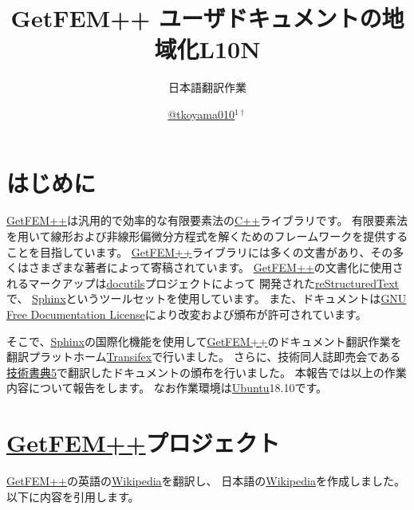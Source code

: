 \documentclass{../../style/ltjoc}
\title{GetFEM++ ユーザドキュメントの地域化L10N}
\subtitle{日本語翻訳作業}
\author{%
\href{https://twitter.com/tkoyama010}{@tkoyama010}$^{1\dagger}$%
}
\affiliation{%
${}^{1}$\href{https://tkoyama010.github.io/getfem-docs-html-ja/}{GetFEM++ Japanese Team}%
}
\begin{document}
\maketitle
\section{はじめに}
\href{http://getfem.org}{GetFEM++}は汎用的で効率的な有限要素法の\href{https://isocpp.org/}{C++}ライブラリです。
有限要素法を用いて線形および非線形偏微分方程式を解くためのフレームワークを提供することを目指しています。
\href{http://getfem.org}{GetFEM++}ライブラリには多くの文書があり、その多くはさまざまな著者によって寄稿されています。
\href{http://getfem.org}{GetFEM++}の文書化に使用されるマークアップは\href{http://docutils.sourceforge.net/}{docutils}プロジェクトによって
開発された\href{http://docutils.sourceforge.net/rst.html}{reStructuredText}で、
\href{http://www.sphinx-doc.org/ja/stable/}{Sphinx}というツールセットを使用しています。
また、ドキュメントは\href{https://www.gnu.org/licenses/fdl.html}{GNU Free Documentation License}により改変および頒布が許可されています。

そこで、\href{http://www.sphinx-doc.org/ja/stable/}{Sphinx}の国際化機能を使用して\href{http://getfem.org}{GetFEM++}のドキュメント翻訳作業を
翻訳プラットホーム\href{https://www.transifex.com}{Transifex}で行いました。
さらに、技術同人誌即売会である\href{https://techbookfest.org/event/tbf05}{技術書典5}で翻訳したドキュメントの頒布を行いました。
本報告では以上の作業内容について報告をします。
なお作業環境は\href{https://www.ubuntu.com/}{Ubuntu}18.10です。

\section{\href{http://getfem.org}{GetFEM++}プロジェクト}
\href{http://getfem.org}{GetFEM++}の英語の\href{https://en.wikipedia.org/wiki/GetFEM++}{Wikipedia}を翻訳し、
日本語の\href{https://ja.wikipedia.org/wiki/GetFEM++}{Wikipedia}を作成しました。
以下に内容を引用します。
\end{document}
